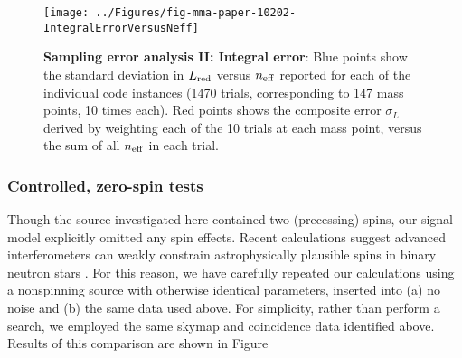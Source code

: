 \begin{figure}
\texttt{[image: ../Figures/fig-mma-paper-10202-IntegralErrorVersusNeff]}
\caption{\label{fig:FiducialEvent:Integral:ErrorEstimate}\textbf{Sampling error analysis II: Integral error}: Blue
  points show the standard deviation in $L_{\rm red}$ versus $n_{\rm eff}$ reported for each of the individual code
  instances (1470 trials, corresponding to 147 mass points, 10 times each).  Red points shows the composite error
  $\sigma_{L}$ derived by weighting each of the 10 trials at each mass point, versus the sum of all $n_{\rm eff}$ in
  each trial.   
}
\end{figure}



\subsubsection{Controlled, zero-spin tests}
Though the source investigated here contained two (precessing) spins, our signal model explicitly omitted any spin
effects.  Recent calculations suggest advanced interferometers can weakly constrain astrophysically plausible spins in
binary neutron stars  \cite{2014PhRvL.112j1101F,2014arXiv1404.3180C}. 
%
For this reason, we have carefully repeated our calculations using a  nonspinning source with otherwise identical parameters, inserted into (a) no
noise and (b) the same data used above.   
%
For simplicity, rather than perform a search, we employed the same skymap and coincidence data identified
above.  
%
Results of this comparison are shown in Figure 



